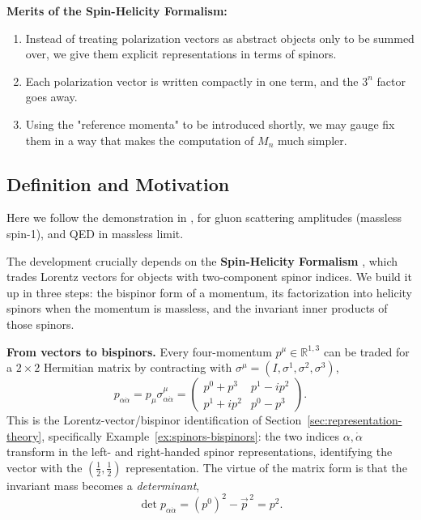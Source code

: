 \textbf{Merits of the Spin-Helicity Formalism:}

\begin{enumerate}
    \item Instead of treating polarization vectors as abstract objects only to be summed over, we give them explicit representations in terms of spinors. 
    \item Each polarization vector is written compactly in one term, and the $3^n$ factor goes away.
    \item Using the "reference momenta" to be introduced shortly, we may gauge fix them in a way that makes the computation of $M_n$ much simpler.
\end{enumerate}

\subsection{Definition and Motivation}
\label{subsec:definition-and-motivation}

Here we follow the demonstration in \autocite[Chapter~27.6]{schwartzQFT2014}, for gluon scattering amplitudes (massless spin-1), and QED in massless limit.

The development crucially depends on the \textbf{Spin-Helicity Formalism} \autocite[\S27.1]{schwartzQFT2014}, which trades Lorentz vectors for objects with two-component spinor indices. We build it up in three steps: the bispinor form of a momentum, its factorization into helicity spinors when the momentum is massless, and the invariant inner products of those spinors.

\textbf{From vectors to bispinors.} Every four-momentum $p^\mu \in \mathbb{R}^{1,3}$ can be traded for a $2 \times 2$ Hermitian matrix by contracting with $\sigma^\mu = (I, \sigma^1, \sigma^2, \sigma^3)$,
\[
	p_{\alpha \dot\alpha} = p_\mu \sigma^\mu_{\alpha \dot\alpha} =
	\begin{pmatrix}
		p^0 + p^3 & p^1 - i p^2 \\
		p^1 + i p^2 & p^0 - p^3
	\end{pmatrix}
.\]
This is the Lorentz-vector/bispinor identification of Section~\ref{sec:representation-theory}, specifically Example~\ref{ex:spinors-bispinors}: the two indices $\alpha, \dot\alpha$ transform in the left- and right-handed spinor representations, identifying the vector with the $\left( \frac{1}{2}, \frac{1}{2} \right)$ representation. The virtue of the matrix form is that the invariant mass becomes a \emph{determinant},
\[
	\operatorname{det} p_{\alpha \dot\alpha} = (p^0)^2 - \vec{p}^{\,2} = p^2
.\]

